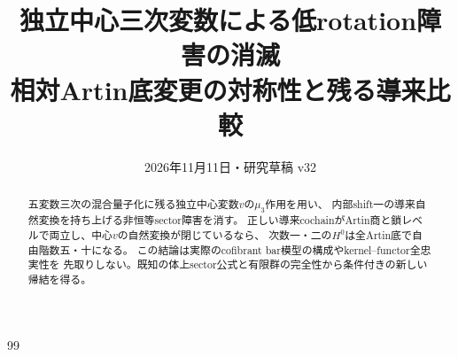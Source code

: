 
\title{独立中心三次変数による低rotation障害の消滅\\\large 相対Artin底変更の対称性と残る導来比較}
\author{}
\date{2026年11月11日・研究草稿 v32}

\maketitle
\begin{abstract}
五変数三次の混合量子化に残る独立中心変数$v$の$\mu_3$作用を用い、
内部shift一の導来自然変換を持ち上げる非恒等sector障害を消す。
正しい導来cochainがArtin商と鎖レベルで両立し、中心$v$の自然変換が閉じているなら、
次数一・二の$H^0$は全Artin底で自由階数五・十になる。
この結論は実際のcofibrant bar模型の構成やkernel--functor全忠実性を
先取りしない。既知の体上sector公式と有限群の完全性から条件付きの新しい帰結を得る。
\end{abstract}


\begin{thebibliography}{99}

\end{thebibliography}

